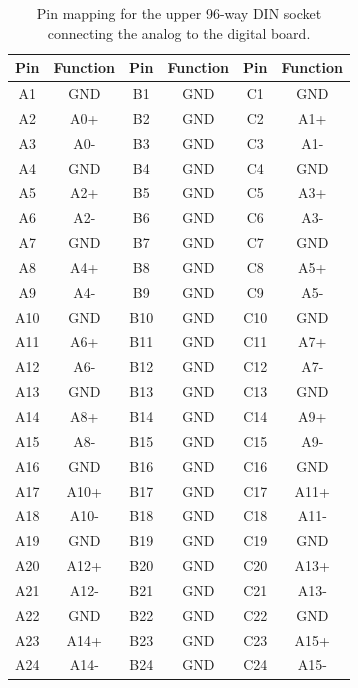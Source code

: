 \documentclass[a4paper]{article}
\begin{document}
\begin{table}[h]
    \begin{center}
        \caption{Pin mapping for the upper 96-way DIN socket connecting the analog to the digital board.}
        \label{tab:DIN96Upper}
        \begin{tabular}{cc|cc|cc}
            \hline
            \hline
            Pin & Function & Pin & Function & Pin & Function \\
            \hline
            A1 & GND & B1 & GND & C1 & GND \\
            A2 & A0+ & B2 & GND & C2 & A1+ \\
            A3 & A0- & B3 & GND & C3 & A1- \\
            A4 & GND & B4 & GND & C4 & GND \\
            A5 & A2+ & B5 & GND & C5 & A3+ \\
            A6 & A2- & B6 & GND & C6 & A3- \\
            A7 & GND & B7 & GND & C7 & GND \\
            A8 & A4+ & B8 & GND & C8 & A5+ \\
            A9 & A4- & B9 & GND & C9 & A5- \\
            A10 & GND & B10 & GND & C10 & GND \\
            A11 & A6+ & B11 & GND & C11 & A7+ \\
            A12 & A6- & B12 & GND & C12 & A7- \\
            A13 & GND & B13 & GND & C13 & GND \\
            A14 & A8+ & B14 & GND & C14 & A9+ \\
            A15 & A8- & B15 & GND & C15 & A9- \\
            A16 & GND & B16 & GND & C16 & GND \\
            A17 & A10+ & B17 & GND & C17 & A11+ \\
            A18 & A10- & B18 & GND & C18 & A11- \\
            A19 & GND & B19 & GND & C19 & GND \\
            A20 & A12+ & B20 & GND & C20 & A13+ \\
            A21 & A12- & B21 & GND & C21 & A13- \\
            A22 & GND & B22 & GND & C22 & GND \\
            A23 & A14+ & B23 & GND & C23 & A15+ \\
            A24 & A14- & B24 & GND & C24 & A15- \\

\end{tabular}
\end{center}
\end{table}
\end{document}
